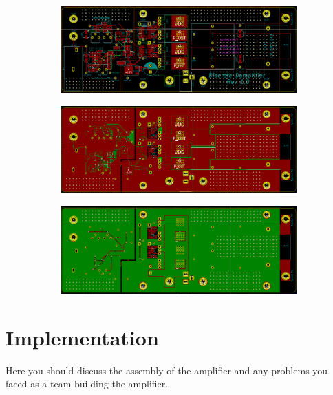 \documentclass[a4paper,11pt]{article}
\begin{document}
\begin{figure}[h!]
    \centering
    \begin{subfigure}{0.8\textwidth}
        \includegraphics[width=\columnwidth]{pcb/traces.png}
        \subcaption{}
    \end{subfigure}
    \begin{subfigure}{0.8\textwidth}
        \includegraphics[width=\columnwidth]{pcb/top_layer.png}
        \subcaption{}
    \end{subfigure}
    \begin{subfigure}{0.8\textwidth}
        \includegraphics[width=\columnwidth]{pcb/bottom_layer.png}
        \subcaption{}
    \end{subfigure}
    \caption{}
\end{figure}


\section{Implementation}

Here you should discuss the assembly of the amplifier and any problems you faced as a team building the amplifier.
\end{document}
